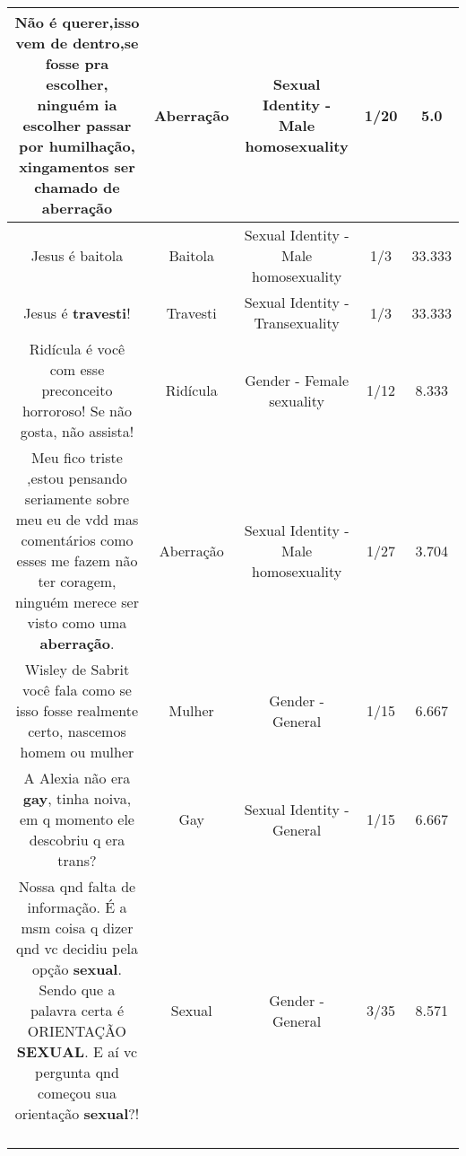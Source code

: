 \documentclass[11pt]{article}
\newlength\mylength
\begin{document}
\begin{center}
\begin{longtable}{|C{.65\mylength}|C{.30\mylength}|C{.12\mylength}|C{.12\mylength}|C{.12\mylength}|}
  \small Não é querer,isso vem de dentro,se fosse pra escolher, ninguém ia escolher passar por humilhação, xingamentos ser chamado de aberração\normalsize   & Aberração & Sexual Identity - Male homosexuality & 1/20 & 5.0 \\  \hline
  \small Jesus é baitola\normalsize   & Baitola & Sexual Identity - Male homosexuality & 1/3 & 33.333 \\  \hline
  \small Jesus é \textbf{travesti}!\normalsize   & Travesti & Sexual Identity - Transexuality & 1/3 & 33.333 \\  \hline
  \small Ridícula é você com esse preconceito horroroso! Se não gosta, não assista!\normalsize   & Ridícula & Gender - Female sexuality & 1/12 & 8.333 \\  \hline
  \small Meu fico triste ,estou pensando seriamente sobre meu eu de vdd mas comentários como esses me fazem não ter coragem, ninguém merece ser visto como uma \textbf{aberração}.\normalsize   & Aberração & Sexual Identity - Male homosexuality & 1/27 & 3.704 \\  \hline
  \small Wisley de Sabrit você fala como se isso fosse realmente certo, nascemos homem ou mulher\normalsize   & Mulher & Gender - General & 1/15 & 6.667 \\  \hline
  \small A Alexia não era \textbf{gay}, tinha noiva, em q momento ele descobriu q era trans?\normalsize   & Gay & Sexual Identity - General & 1/15 & 6.667 \\  \hline
  \small Nossa qnd falta de informação. É a msm coisa q dizer qnd vc decidiu pela opção \textbf{sexual}. Sendo que a palavra certa é ORIENTAÇÃO \textbf{SEXUAL}. E aí vc pergunta qnd começou sua orientação \textbf{sexual}?!  🙈🙉🙈🙉🙈\normalsize   & Sexual & Gender - General & 3/35 & 8.571 \\  \hline

\end{longtable}
\end{center}
\end{document}
